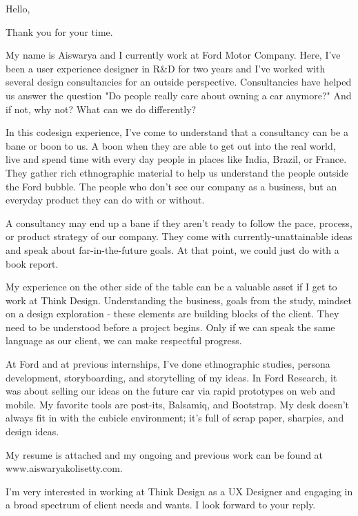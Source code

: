 \documentclass[10pt,a4paper,sans]{moderncv}        %
\begin{document}
\date{May 25, 2015}
\opening{Hello,}
\closing{Thank you for your time.}
\makelettertitle

My name is Aiswarya and I currently work at Ford Motor Company.  Here, I've been a user experience designer in R\&D for two years and I've worked with several design consultancies for an outside perspective.  Consultancies have helped us answer the question "Do people really care about owning a car anymore?"  And if not, why not? What can we do differently?
 
In this codesign experience, I've come to understand that a consultancy can be a bane or boon to us.  A boon when they are able to get out into the real world, live and spend time with every day people in places like India, Brazil, or France.  They gather rich ethnographic material to help us understand the people outside the Ford bubble.  The people who don't see our company as a business, but an everyday product they can do with or without.  

A consultancy may end up a bane if they aren't ready to follow the pace, process, or product strategy of our company.  They come with currently-unattainable ideas and speak about far-in-the-future goals.  At that point, we could just do with a book report.
 
My experience on the other side of the table can be a valuable asset if I get to work at Think Design.  Understanding the business, goals from the study, mindset on a design exploration - these elements are building blocks of the client.  They need to be understood before a project begins.  Only if we can speak the same language as our client, we can make respectful progress.  

At Ford and at previous internships, I've done ethnographic studies, persona development, storyboarding, and storytelling of my ideas.  In Ford Research, it was about selling our ideas on the future car via rapid prototypes on web and mobile.  My favorite tools are post-its, Balsamiq, and Bootstrap.  My desk doesn't always fit in with the cubicle environment; it's full of scrap paper, sharpies, and design ideas.

My resume is attached and my ongoing and previous work can be found at www.aiswaryakolisetty.com.

I'm very interested in working at Think Design as a UX Designer and engaging in a broad spectrum of client needs and wants.  I look forward to your reply.
\end{document}
